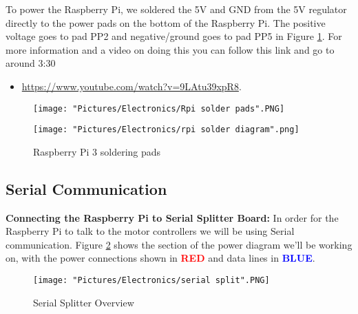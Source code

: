 \documentclass[12pt]{article}
\begin{document}
\noindent To power the Raspberry Pi, we soldered the 5V and GND from the 5V regulator directly to the power pads on the bottom of the Raspberry Pi. The positive voltage goes to pad PP2 and negative/ground goes to pad PP5 in Figure \ref{rpi pads}. For more information and a video on doing this you can follow this link and go to around 3:30 
\begin{itemize}
	\item \href{https://www.youtube.com/watch?v=9LAtu39xpR8}{https://www.youtube.com/watch?v=9LAtu39xpR8}. 
\end{itemize}

\begin{figure}[H]
 	\centering
  	\begin{minipage}[b]{0.40\textwidth}
		\texttt{[image: "Pictures/Electronics/Rpi solder pads".PNG]}
  	\end{minipage}
  	\hfill
  	\begin{minipage}[b]{0.50\textwidth}
    		\texttt{[image: "Pictures/Electronics/rpi solder diagram".png]}
  	\end{minipage}
	\caption{Raspberry Pi 3 soldering pads}
	\label{rpi pads}
\end{figure}



\subsection{Serial Communication}

\textbf{Connecting the Raspberry Pi to Serial Splitter Board:} In order for the Raspberry Pi to talk to the motor controllers we will be using Serial communication. Figure \ref{ss} shows the section of the power diagram we'll be working on, with the power connections shown in \textcolor{red}{\textbf{RED}} and data lines in \textcolor{blue}{\textbf{BLUE}}. 

\begin{figure}[H]
  	\centering
    	\texttt{[image: "Pictures/Electronics/serial split".PNG]}
 	\caption{Serial Splitter Overview}
	\label{ss}
\end{figure}


\end{document}
